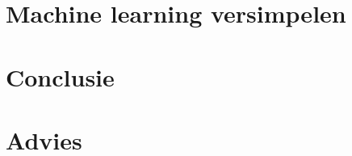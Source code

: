 \section{Machine learning versimpelen}\label{sec:machine-learning-versimpelen}


\section{Conclusie}\label{conclusie}


\section{Advies}\label{advies}